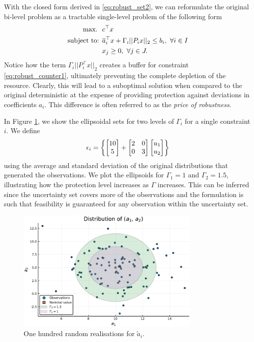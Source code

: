 \documentclass{article}
\begin{document}
With the closed form derived in \eqref{eq:robust_set2}, we can reformulate the original bi-level problem as a tractable single-level problem of the following form
%
\begin{align}
\maxi \ &  c^\top x \nonumber \\
\st & \overline{a}_i^\top x + \Gamma_i||P_i x||_2 \leq b_i, \ \forall i \in I \label{eq:robust_counter1}\\
& x_j \geq 0, \ \forall j \in J. \nonumber
\end{align} 
%
Notice how the term $\Gamma_i||P_i^\top x||_2$ creates a buffer for constraint \eqref{eq:robust_counter1}, ultimately preventing the complete depletion of the resource. Clearly, this will lead to a suboptimal solution when compared to the original deterministic at the expense of providing protection against deviations in coefficients $a_i$. This difference is often referred to as the \emph{price of robustness}.

In Figure \ref{fig:ellipsoids}, we show the ellipsoidal sets for two levels of $\Gamma_i$ for a single constraint $i$. We define 
%
\begin{align}
\epsilon_i = \left\{ \begin{bmatrix} 10 \\ 5 \end{bmatrix} + \begin{bmatrix} 2 & 0 \\ 0 & 3 \end{bmatrix} \begin{bmatrix} u_1 \\ u_2 \end{bmatrix} \right \}
\end{align}
%
using the average and standard deviation of the original distributions that generated the observations. We plot the ellipsoids for $\Gamma_1 = 1$ and $\Gamma_2 = 1.5$, illustrating how the protection level increases as $\Gamma$ increases. This can be inferred since the uncertainty set covers more of the observations and the formulation is such that feasibility is guaranteed for any observation within the uncertainty set. 
%
\begin{figure}
\includegraphics[width=0.8\textwidth]{Figures/data_with_ellipsoid.pdf}
\caption{One hundred random realisations for $\tilde{a}_i$.} \label{fig:ellipsoids}
\end{figure}
%
\end{document}
